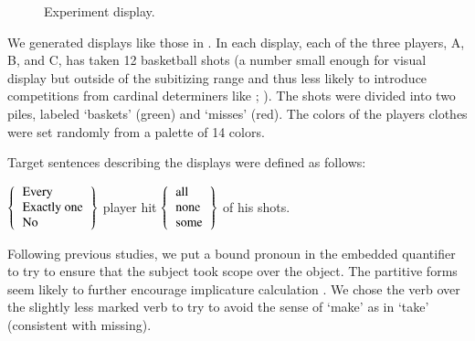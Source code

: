 \documentclass[leqno,12pt]{article}
\begin{document}
\begin{figure}[t]
  \centering
  \caption{Experiment display.}
  \label{fig:exp1}
\end{figure}

We generated displays like those in . In each
display, each of the three players, A, B, and C, has taken 12
basketball shots (a number small enough for visual display but outside
of the subitizing range and thus less likely to introduce competitions
from cardinal determiners like ;
\citealt{Degen:Tanenhaus:2014}). The shots were divided into two
piles, labeled `baskets' (green) and `misses' (red).  The colors of
the players clothes were set randomly from a palette of 14 colors.

Target sentences describing the displays were defined as follows:
%
\begin{examples}
\item\label{expmsgs} 
  $\set{
      \begin{tabular}[c]{l}
        Every \\
        Exactly one \\
        No 
      \end{tabular}}$
    player hit 
    $\set{
      \begin{tabular}[c]{l}
        all \\
        none \\
        some 
      \end{tabular}}$
    of his shots.  
\end{examples}
%
Following previous studies, we put a bound pronoun in the embedded
quantifier to try to ensure that the subject took scope over the
object. The partitive forms seem likely to further encourage
implicature calculation \citep{reed:1991-interpreting,Grodner-etal:2010,degen:inpress-SP}. We chose the verb
 over the slightly less marked verb  to try to
avoid the sense of `make' as in `take' (consistent with missing).
\end{document}
